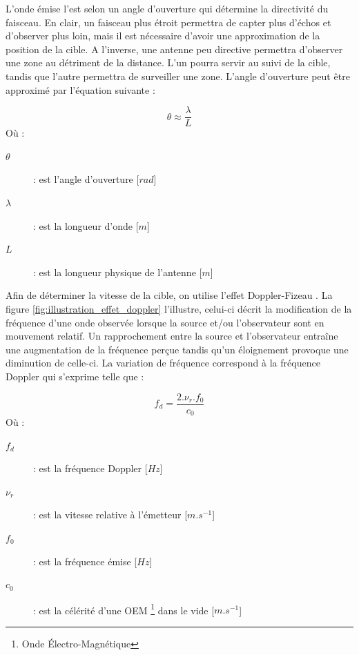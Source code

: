 L'onde émise l'est selon un angle d'ouverture qui détermine la directivité du faisceau. En clair, un faisceau plus étroit permettra de capter plus d'échos et d'observer plus loin, mais il est nécessaire d'avoir une approximation de la position de la cible. A l'inverse, une antenne peu directive permettra d'observer une zone au détriment de la distance. L'un pourra servir au suivi de la cible, tandis que l'autre permettra de surveiller une zone. L'angle d'ouverture peut être approximé par l'équation suivante :

\begin{equation}
    \theta \approx \frac{\lambda}{L}
    \label{eq:approx_angle_ouverture_antenne}
\end{equation}
Où :
\begin{description}
    \item[$\theta$] : est l'angle d'ouverture [$rad$]
    \item[$\lambda$] : est la longueur d’onde [$m$]
    \item[$L$] : est la longueur physique de l'antenne [$m$]
\end{description}

Afin de déterminer la vitesse de la cible, on utilise l'effet Doppler-Fizeau \cite{skolnik2001}. La figure \ref{fig:illustration_effet_doppler} l'illustre, celui-ci décrit la modification de la fréquence d'une onde observée lorsque la source et/ou l'observateur sont en mouvement relatif. Un rapprochement entre la source et l'observateur entraîne une augmentation de la fréquence perçue tandis qu'un éloignement provoque une diminution de celle-ci. La variation de fréquence correspond à la fréquence Doppler qui s'exprime telle que :

\begin{equation}
    f_d = \frac{2.\nu_r.f_0}{c_0}
    \label{eq:frequence_doppler}
\end{equation}
Où :
\begin{description}
    \item[$f_d$] : est la fréquence Doppler [$Hz$]
    \item[$\nu_r$] : est la vitesse relative à l'émetteur [$m.s^{-1}$]
    \item[$f_0$] : est la fréquence émise [$Hz$] 
    \item[$c_0$] : est la célérité d'une OEM \footnote{Onde Électro-Magnétique} dans le vide [$m.s^{-1}$] 
\end{description}

